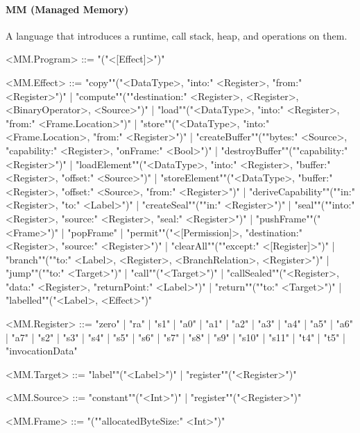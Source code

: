 \documentclass[main.tex]{subfiles}
\begin{document}
\paragraph{ MM (Managed Memory) } A language that introduces a runtime, call stack, heap, and operations on them.
\begin{grammar}
	\footnotesize
				<MM.Program> ::=
							"("<[Effect]>")"
				\par
				<MM.Effect> ::=
						"copy""("<DataType>, "into:" <Register>, "from:" <Register>")"
						| "compute""(""destination:" <Register>, <Register>, <BinaryOperator>, <Source>")"
						| "load""("<DataType>, "into:" <Register>, "from:" <Frame.Location>")"
						| "store""("<DataType>, "into:" <Frame.Location>, "from:" <Register>")"
						| "createBuffer""(""bytes:" <Source>, "capability:" <Register>, "onFrame:" <Bool>")"
						| "destroyBuffer""(""capability:" <Register>")"
						| "loadElement""("<DataType>, "into:" <Register>, "buffer:" <Register>, "offset:" <Source>")"
						| "storeElement""("<DataType>, "buffer:" <Register>, "offset:" <Source>, "from:" <Register>")"
						| "deriveCapability""(""in:" <Register>, "to:" <Label>")"
						| "createSeal""(""in:" <Register>")"
						| "seal""(""into:" <Register>, "source:" <Register>, "seal:" <Register>")"
						| "pushFrame""("<Frame>")"
						| "popFrame"
						| "permit""("<[Permission]>, "destination:" <Register>, "source:" <Register>")"
						| "clearAll""(""except:" <[Register]>")"
						| "branch""(""to:" <Label>, <Register>, <BranchRelation>, <Register>")"
						| "jump""(""to:" <Target>")"
						| "call""("<Target>")"
						| "callSealed""("<Register>, "data:" <Register>, "returnPoint:" <Label>")"
						| "return""(""to:" <Target>")"
						| "labelled""("<Label>, <Effect>")"
				\par
				<MM.Register> ::=
						"zero"
						| "ra"
						| "s1"
						| "a0"
						| "a1"
						| "a2"
						| "a3"
						| "a4"
						| "a5"
						| "a6"
						| "a7"
						| "s2"
						| "s3"
						| "s4"
						| "s5"
						| "s6"
						| "s7"
						| "s8"
						| "s9"
						| "s10"
						| "s11"
						| "t4"
						| "t5"
						| "invocationData"
				\par
				<MM.Target> ::=
						"label""("<Label>")"
						| "register""("<Register>")"
				\par
				<MM.Source> ::=
						"constant""("<Int>")"
						| "register""("<Register>")"
				\par
				<MM.Frame> ::=
							"(""allocatedByteSize:" <Int>")"
				\par
\end{grammar}
\par
\end{document}
